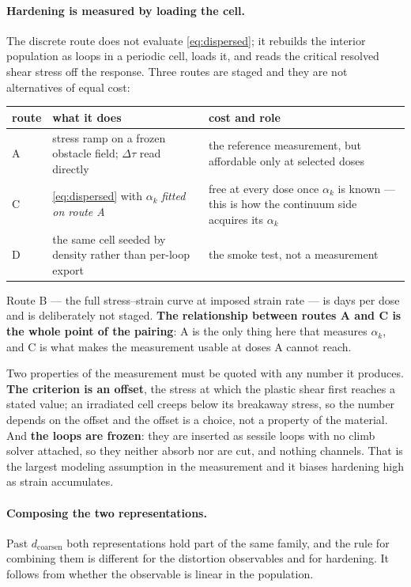 \documentclass{article}
\begin{document}
\paragraph{Hardening is measured by loading the cell.} The discrete route does
not evaluate \cref{eq:dispersed}; it rebuilds the interior population as loops in a
periodic cell, loads it, and reads the critical resolved shear stress off the
response. Three routes are staged and they are not alternatives of equal cost:

\begin{center}\small
\begin{tabularx}{\textwidth}{@{}l l X@{}}
\toprule
route & what it does & cost and role \\
\midrule
A & stress ramp on a frozen obstacle field; $\Delta\tau$ read directly &
the reference measurement, but affordable only at selected doses \\
C & \cref{eq:dispersed} with $\alpha_k$ \emph{fitted on route A} &
free at every dose once $\alpha_k$ is known --- this is how the continuum side
acquires its $\alpha_k$ \\
D & the same cell seeded by density rather than per-loop export &
the smoke test, not a measurement \\
\bottomrule
\end{tabularx}
\end{center}

Route B --- the full stress--strain curve at imposed strain rate --- is days per
dose and is deliberately not staged. \textbf{The relationship between routes A
and C is the whole point of the pairing}: A is the only thing here that measures
$\alpha_k$, and C is what makes the measurement usable at doses A cannot reach.

Two properties of the measurement must be quoted with any number it produces.
\textbf{The criterion is an offset}, the stress at which the plastic shear first
reaches a stated value; an irradiated cell creeps below its breakaway stress, so
the number depends on the offset and the offset is a choice, not a property of
the material. And \textbf{the loops are frozen}: they are inserted as sessile
loops with no climb solver attached, so they neither absorb nor are cut, and
nothing channels. That is the largest modeling assumption in the measurement and
it biases hardening high as strain accumulates.

\paragraph{Composing the two representations.}
\label{sec:obs-compose}
Past $d_{\mathrm{coarsen}}$ both representations hold part of the same family, and
the rule for combining them is different for the distortion observables and for
hardening. It follows from whether the observable is linear in the population.
\end{document}
